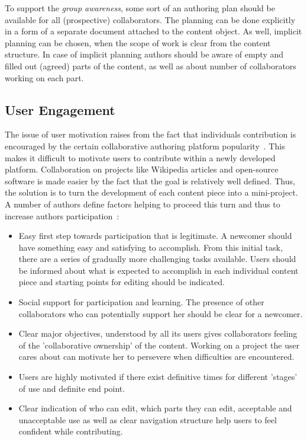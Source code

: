 \documentclass[PhD, Submit, ngerman,UKenglish,table]{scrbook}
\begin{document}
To support the \emph{group awareness}, some sort of an authoring plan should be available for all (prospective) collaborators.
The planning can be done explicitly in a form of a separate document attached to the content object.
As well, implicit planning can be chosen, when the scope of work is clear from the content structure. 
In case of implicit planning authors should be aware of empty and filled out (agreed) parts of the content, as well as about number of collaborators working on each part.



\subsection{User Engagement}
\label{sec:user_angagement}
The issue of user motivation raises from the fact that individuals contribution is encouraged by the certain collaborative authoring platform popularity~\cite{Bruckman2008}. 
This makes it difficult to motivate users to contribute within a newly developed platform.
Collaboration on projects like Wikipedia articles and open-source software is made easier by the fact that the goal is relatively well defined.
Thus, the solution is to turn the development of each content piece into a mini-project.
A number of authors define factors helping to proceed this turn and thus to increase authors participation~\cite{Bruckman2008, foord2007stolen}: 

\begin{itemize}
\item Easy first step towards participation that is legitimate.
A newcomer should have something easy and satisfying to accomplish.
From this initial task, there are a series of gradually more challenging tasks available.
Users should be informed about what is expected to accomplish in each individual content piece and starting points for editing should be indicated.
\item Social support for participation and learning.
The presence of other collaborators who can potentially support her should be clear for a newcomer.
\item Clear major objectives, understood by all its users gives collaborators feeling of the 'collaborative ownership' of the content.
Working on a project the user cares about can motivate her to persevere when difficulties are encountered.
\item Users are highly motivated if there exist definitive times for different 'stages' of use and definite end point.
\item Clear indication of who can edit, which parts they can edit, acceptable and unacceptable use as well as clear navigation structure help users to feel confident while contributing.
\end{itemize}
\end{document}

